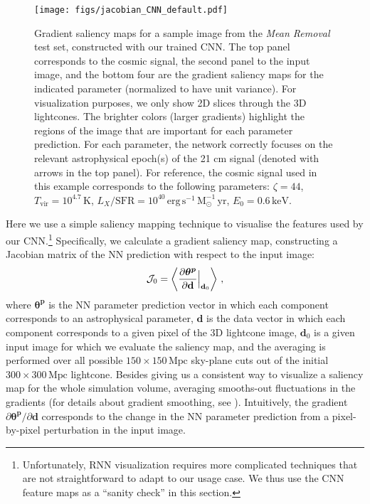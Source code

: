 \documentclass[fleqn,usenatbib]{mnras}
\renewcommand{\b}{\mathbf}
\begin{document}
\begin{figure*}
    \centering
    \texttt{[image: figs/jacobian\_CNN\_default.pdf]}
    \caption{Gradient saliency maps for a sample image from the \textit{Mean Removal}  test set, constructed with our trained CNN. The top panel corresponds to the cosmic signal, the second panel to the input image, and the bottom four are the gradient saliency maps for the indicated parameter (normalized to have unit variance). For visualization purposes, we only show 2D slices through the 3D lightcones. The brighter colors (larger gradients) highlight the regions of the image that are important for each parameter prediction.  For each  parameter, the network correctly focuses on the relevant astrophysical epoch(s) of the 21 cm signal (denoted with arrows in the top panel).
    For reference, the cosmic signal used in this example corresponds to the following parameters: $\zeta = 44$, $T_{\mathrm{vir}} = 10^{4.7} \, \mathrm{K}$, $L_X / \mathrm{SFR} = 10^{40} \, \mathrm{erg \, s^{-1} \, M_\odot^{-1} \, yr}$, $E_0 = 0.6 \, \mathrm{keV}$.}    \label{fig:jacobian_CNN}
\end{figure*}

Here we use a simple saliency mapping technique \citep{simonyan13} to visualise the features used by our CNN.\footnote{Unfortunately, RNN visualization requires more complicated techniques \citep{karpathy15, ramanishka17, bargal18} that are not straightforward to adapt to our usage case.  We thus use the CNN feature maps as a \enquote{sanity check} in this section.} 
Specifically, we calculate a gradient saliency map, constructing a Jacobian matrix of the NN prediction with respect to the input image:
\begin{equation}
\label{eq:grad}
    \mathcal{J}_0 = \left\langle\frac{\partial \boldsymbol{\theta^p}}{\partial \b{d}} \Big{|}_{\b{d}_0}\right\rangle \, ,
\end{equation}
where $\boldsymbol{\theta^p}$ is the NN parameter prediction vector in which each component corresponds to an astrophysical parameter, $\b{d}$ is the data vector in which each component corresponds to a given pixel of the 3D lightcone image, $\b{d}_0$ is a given input image for which we evaluate the saliency map, and the averaging is performed over all possible $150\times150 \,\mathrm{Mpc}$ sky-plane cuts out of the initial $300\times300 \,\mathrm{Mpc}$ lightcone.
Besides giving us a consistent way to visualize a saliency map for the whole simulation volume, averaging smooths-out fluctuations in the gradients (for details about gradient smoothing, see \citealt{smilkov17}).
Intuitively, the gradient $\partial \boldsymbol{\theta^p}/\partial \b{d}$ corresponds to the change in the NN parameter prediction from a pixel-by-pixel perturbation in the input image. 
\end{document}
